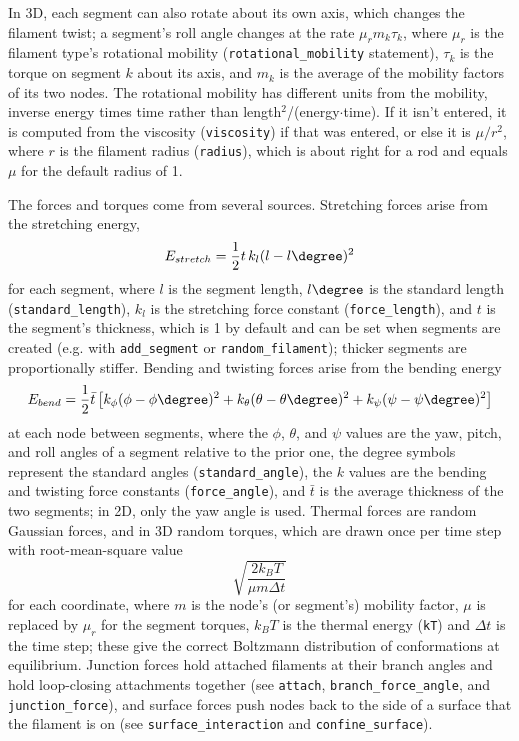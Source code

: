 \documentclass {scrbook}
\newcommand {\ttt} {\texttt}
\begin{document}
In 3D, each segment can also rotate about its own axis, which changes the filament twist; a segment's roll angle changes at the rate $\mu_r m_k \tau_k$, where $\mu_r$ is the filament type's rotational mobility (\ttt{rotational\_mobility} statement), $\tau_k$ is the torque on segment $k$ about its axis, and $m_k$ is the average of the mobility factors of its two nodes. The rotational mobility has different units from the mobility, inverse energy times time rather than length$^2$/(energy$\cdot$time). If it isn't entered, it is computed from the viscosity (\ttt{viscosity}) if that was entered, or else it is $\mu/r^2$, where $r$ is the filament radius (\ttt{radius}), which is about right for a rod and equals $\mu$ for the default radius of 1.

The forces and torques come from several sources. Stretching forces arise from the stretching energy,
$$E_{stretch} = \frac{1}{2} t\,k_l(l-l\degree)^2$$
for each segment, where $l$ is the segment length, $l\degree$ is the standard length (\ttt{standard\_length}), $k_l$ is the stretching force constant (\ttt{force\_length}), and $t$ is the segment's thickness, which is 1 by default and can be set when segments are created (e.g. with \ttt{add\_segment} or \ttt{random\_filament}); thicker segments are proportionally stiffer. Bending and twisting forces arise from the bending energy
$$E_{bend} = \frac{1}{2} \bar{t} \left[k_\phi (\phi-\phi\degree)^2 + k_\theta (\theta-\theta\degree)^2 + k_\psi (\psi-\psi\degree)^2 \right]$$
at each node between segments, where the $\phi$, $\theta$, and $\psi$ values are the yaw, pitch, and roll angles of a segment relative to the prior one, the degree symbols represent the standard angles (\ttt{standard\_angle}), the $k$ values are the bending and twisting force constants (\ttt{force\_angle}), and $\bar{t}$ is the average thickness of the two segments; in 2D, only the yaw angle is used. Thermal forces are random Gaussian forces, and in 3D random torques, which are drawn once per time step with root-mean-square value
$$\sqrt{\frac{2k_BT}{\mu m \Delta t}}$$
for each coordinate, where $m$ is the node's (or segment's) mobility factor, $\mu$ is replaced by $\mu_r$ for the segment torques, $k_BT$ is the thermal energy (\ttt{kT}) and $\Delta t$ is the time step; these give the correct Boltzmann distribution of conformations at equilibrium. Junction forces hold attached filaments at their branch angles and hold loop-closing attachments together (see \ttt{attach}, \ttt{branch\_force\_angle}, and \ttt{junction\_force}), and surface forces push nodes back to the side of a surface that the filament is on (see \ttt{surface\_interaction} and \ttt{confine\_surface}).
\end{document}

